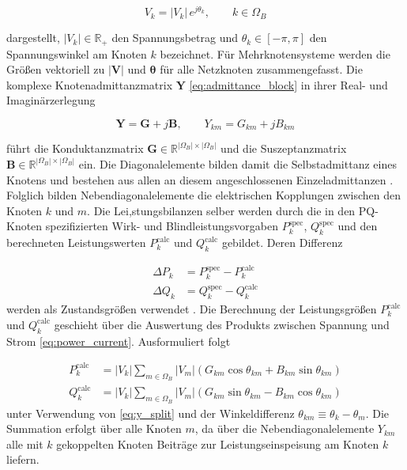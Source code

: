 \begin{equation}
	\label{eq:polar_voltage}
	V_k = |V_k| \, e^{j\theta_k}, \qquad k \in \Omega_B
\end{equation}

dargestellt, $|V_k| \in \mathbb{R}_{+}$ den Spannungsbetrag und $\theta_k \in [-\pi, \pi]$ den Spannungswinkel am Knoten $k$ bezeichnet.
Für Mehrknotensysteme werden die Größen vektoriell zu $|\mathbf{V}|$ und $\boldsymbol{\theta}$ für alle Netzknoten zusammengefasst.
Die komplexe Knotenadmittanzmatrix $\mathbf{Y}$ \eqref{eq:admittance_block} in ihrer Real- und Imaginärzerlegung 

\begin{equation}
	\label{eq:y_split}
	\mathbf{Y} = \mathbf{G} + j\mathbf{B}, \qquad Y_{km} = G_{km} + jB_{km}
\end{equation}

führt die Konduktanzmatrix $\mathbf{G} \in \mathbb{R}^{|\Omega_B|\times|\Omega_B|}$ und die Suszeptanzmatrix $\mathbf{B} \in \mathbb{R}^{|\Omega_B|\times|\Omega_B|}$ ein.
Die Diagonalelemente bilden damit die Selbstadmittanz eines Knotens und bestehen aus allen an diesem angeschlossenen Einzeladmittanzen . 
Folglich bilden Nebendiagonalelemente die elektrischen Kopplungen zwischen den Knoten $k$ und $m$.
Die Lei,stungsbilanzen selber werden durch die in den PQ-Knoten spezifizierten Wirk- und Blindleistungsvorgaben $P_k^{\text{spec}}$, $Q_k^{\text{spec}}$ und den berechneten Leistungswerten $P_k^{\text{calc}}$ und $Q_k^{\text{calc}}$ gebildet.
Deren Differenz

\begin{equation}
	\label{eq:mismatches}
	\begin{aligned}
		\Delta P_k &= P_k^{\text{spec}} - P_k^{\text{calc}} \\
		\Delta Q_k &= Q_k^{\text{spec}} - Q_k^{\text{calc}}
	\end{aligned}
\end{equation}
werden als Zustandsgrößen verwendet .
Die Berechnung der Leistungsgrößen $P_k^{\text{calc}}$ und $Q_k^{\text{calc}}$ geschieht über die Auswertung des Produkts zwischen Spannung und Strom \eqref{eq:power_current}.
Ausformuliert folgt


\begin{equation}
	\label{eq:pq_calc}
	\begin{aligned}
		P_k^{\text{calc}} &= |V_k| \sum_{m \in \Omega_B} |V_m| \left( G_{km}\cos\theta_{km} + B_{km}\sin\theta_{km} \right) \\
		Q_k^{\text{calc}} &= |V_k| \sum_{m \in \Omega_B} |V_m| \left( G_{km}\sin\theta_{km} - B_{km}\cos\theta_{km} \right)
	\end{aligned}
\end{equation}
unter Verwendung von \eqref{eq:y_split} und der Winkeldifferenz $\theta_{km} \equiv \theta_k - \theta_m$.
Die Summation erfolgt über alle Knoten $m$, da über die Nebendiagonalelemente $Y_{km}$ alle mit $k$ gekoppelten Knoten Beiträge zur Leistungseinspeisung am Knoten $k$ liefern.  \\





